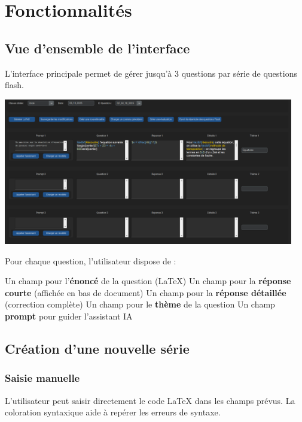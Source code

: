 \section{Fonctionnalités}

\subsection{Vue d'ensemble de l'interface}

L'interface principale permet de gérer jusqu'à 3 questions par série de questions flash.

\begin{center}
\includegraphics[width=0.95\textwidth]{images/UseCase_global.png}
\end{center}

Pour chaque question, l'utilisateur dispose de :
\begin{tcbenumerate}
    \tcbitem Un champ pour l'\textbf{énoncé} de la question (LaTeX)
    \tcbitem Un champ pour la \textbf{réponse courte} (affichée en bas de document)
    \tcbitem Un champ pour la \textbf{réponse détaillée} (correction complète)
    \tcbitem Un champ pour le \textbf{thème} de la question
    \tcbitem Un champ \textbf{prompt} pour guider l'assistant IA
\end{tcbenumerate}

\subsection{Création d'une nouvelle série}

\subsubsection{Saisie manuelle}

L'utilisateur peut saisir directement le code LaTeX dans les champs prévus. La coloration syntaxique aide à repérer les erreurs de syntaxe.

